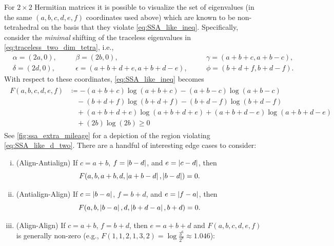 \documentclass[notitlepage, 10pt]{article}
\begin{document}
\begin{rem}
    For $2\times 2$ Hermitian matrices it is possible to visualize the set of eigenvalues (in the same $(a,b,c,d,e,f)$ coordinates used above) which are known to be non-tetrahedral on the basis that they violate \cref{eq:SSA_like_ineq}.
    Specifically, consider the \textit{minimal} shifting of the traceless eigenvalues in \cref{eq:traceless_two_dim_tetra}, i.e.,
    \begin{equation}
        \begin{alignedat}{3}
            &\alpha = (2a, 0), \quad
            &&\beta = (2b, 0), \quad
            &&\gamma = (a+b+c, a+b-c), \quad \\
            &\delta = (2d, 0), \quad
            &&\epsilon = (a+b+d+e, a+b+d-e), \quad
            &&\phi = (b+d+f, b+d-f).
        \end{alignedat}
    \end{equation}
    With respect to these coordinates, \cref{eq:SSA_like_ineq} becomes 
    \begin{align}
        \label{eq:SSA_like_d_two}
        \begin{split}
            F(a,b,c,d,e,f)
            &\coloneqq
            -(a+b+c)\log(a+b+c)-(a+b-c)\log(a+b-c) \\
            &\quad-(b+d+f)\log(b+d+f)-(b+d-f)\log(b+d-f)\\
            &\quad+(a+b+d+e)\log(a+b+d+e)+(a+b+d-e)\log(a+b+d-e)\\
            &\quad+(2b)\log(2b) \geq 0
        \end{split}
    \end{align}
    See \cref{fig:ssa_extra_mileage} for a depiction of the region violating \cref{eq:SSA_like_d_two}.
    There are a handful of interesting edge cases to consider:
    \begin{enumerate}[(i)]
        \item (Align-Antialign) If $c = a+b$, $f = \left|b-d\right|$, and $e = \left|c-d\right|$, then 
            \begin{equation}
                F(a,b,a+b,d,\left|a+b-d\right|,\left|b-d\right|) = 0.
            \end{equation}
        \item (Antialign-Align) If $c = \left|b-a\right|$, $f = b+d$, and $e = \left|f-a\right|$, then 
            \begin{equation}
                F(a,b,\left|b-a\right|,d,\left|b+d-a\right|,b+d) = 0.
            \end{equation}
        \item (Align-Align) If $c=a+b$, $f=b+d$, then $e = a+b+d$ and $F(a,b,c,d,e,f)$ is generally non-zero (e.g., $F(1,1,2,1,3,2) = \log\frac{3^6}{2^8} \approx 1.046$):

\end{enumerate}
\end{rem}
\end{document}
